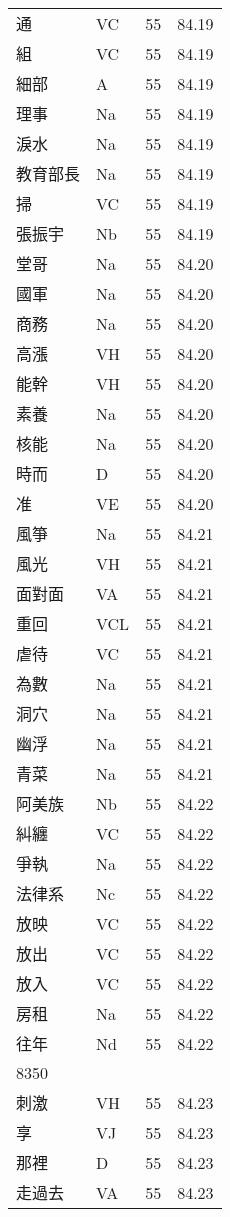 \documentclass[twocolumn]{book}
\begin{document}
\begin{supertabular}{llrr}
通 & VC & 55 &  84.19\\
組 & VC & 55 &  84.19\\
細部 & A & 55 &  84.19\\
理事 & Na & 55 &  84.19\\
淚水 & Na & 55 &  84.19\\
教育部長 & Na & 55 &  84.19\\
掃 & VC & 55 &  84.19\\
張振宇 & Nb & 55 &  84.19\\
堂哥 & Na & 55 &  84.20\\
國軍 & Na & 55 &  84.20\\
商務 & Na & 55 &  84.20\\
高漲 & VH & 55 &  84.20\\
能幹 & VH & 55 &  84.20\\
素養 & Na & 55 &  84.20\\
核能 & Na & 55 &  84.20\\
時而 & D & 55 &  84.20\\
准 & VE & 55 &  84.20\\
風箏 & Na & 55 &  84.21\\
風光 & VH & 55 &  84.21\\
面對面 & VA & 55 &  84.21\\
重回 & VCL & 55 &  84.21\\
虐待 & VC & 55 &  84.21\\
為數 & Na & 55 &  84.21\\
洞穴 & Na & 55 &  84.21\\
幽浮 & Na & 55 &  84.21\\
青菜 & Na & 55 &  84.21\\
阿美族 & Nb & 55 &  84.22\\
糾纏 & VC & 55 &  84.22\\
爭執 & Na & 55 &  84.22\\
法律系 & Nc & 55 &  84.22\\
放映 & VC & 55 &  84.22\\
放出 & VC & 55 &  84.22\\
放入 & VC & 55 &  84.22\\
房租 & Na & 55 &  84.22\\
往年 & Nd & 55 &  84.22\\
8350\\
刺激 & VH & 55 &  84.23\\
享 & VJ & 55 &  84.23\\
那裡 & D & 55 &  84.23\\
走過去 & VA & 55 &  84.23\\

\end{supertabular}
\end{document}
